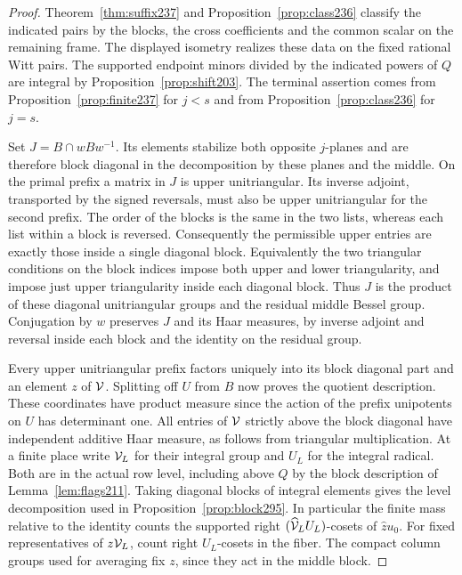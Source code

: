 \documentclass[a4paper,11pt]{article}
\theoremstyle{definition}
\theoremstyle{remark}
\numberwithin{equation}{section}
\begin{document}
\begin{proof}
Theorem~\ref{thm:suffix237} and Proposition~\ref{prop:class236}
classify the indicated pairs by the blocks, the cross
coefficients and the common scalar on the remaining frame.
The displayed isometry realizes these data on the fixed
rational Witt pairs. The supported endpoint minors divided
by the indicated powers of \(Q\) are integral by
Proposition~\ref{prop:shift203}. The terminal assertion comes
from Proposition~\ref{prop:finite237} for \(j<s\) and from
Proposition~\ref{prop:class236} for \(j=s\).

Set \(J=B\cap wBw^{-1}\). Its elements stabilize both
opposite \(j\)-planes and are therefore block diagonal in
the decomposition by these planes and the middle. On the
primal prefix a matrix in \(J\) is upper unitriangular.
Its inverse adjoint, transported by the signed reversals,
must also be upper unitriangular for the second prefix.
The order of the blocks is the same in the two lists,
whereas each list within a block is reversed. Consequently
the permissible upper entries are exactly those inside a
single diagonal block. Equivalently the two triangular
conditions on the block indices impose both upper and lower
triangularity, and impose just upper triangularity inside
each diagonal block. Thus \(J\) is the product of these
diagonal unitriangular groups and the residual middle
Bessel group. Conjugation by \(w\) preserves \(J\) and
its Haar measures, by inverse adjoint and reversal inside
each block and the identity on the residual group.

Every upper unitriangular prefix factors uniquely into its
block diagonal part and an element \(z\) of \({\cal V}\).
Splitting off \(U\) from \(B\) now proves the quotient
description. These coordinates have product measure since
the action of the prefix unipotents on \(U\) has determinant
one. All entries of \({\cal V}\) strictly above the block
diagonal have independent additive Haar measure, as follows
from triangular multiplication. At a finite place write
\({\cal V}_L\) for their integral group and \(U_L\) for the
integral radical. Both are in the actual row level,
including above \(Q\) by the block description of
Lemma~\ref{lem:flags211}. Taking diagonal blocks of integral
elements gives the level decomposition used in
Proposition~\ref{prop:block295}. In particular the finite
mass relative to the identity counts the supported right
\((\widehat{\cal V}_L U_L)\)-cosets of \(\widehat z u_0\).
For fixed representatives of \(z{\cal V}_L\), count
right \(U_L\)-cosets in the fiber. The compact column
groups used for averaging fix \(z\), since they act in
the middle block.


\end{proof}
\end{document}
